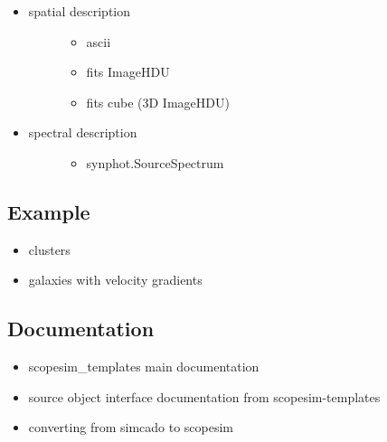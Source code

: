 \begin{itemize}
\item 
\begin{description}
\item[{spatial description}] \leavevmode 
\begin{itemize}
\item ascii

\item fits ImageHDU

\item fits cube (3D ImageHDU)
\end{itemize}

\end{description}

\item 
\begin{description}
\item[{spectral description}] \leavevmode 
\begin{itemize}
\item synphot.SourceSpectrum
\end{itemize}

\end{description}
\end{itemize}


\subsection{Example%
  \label{example}%
}


\begin{itemize}
\item clusters

\item galaxies with velocity gradients
\end{itemize}


\subsection{Documentation%
  \label{documentation}%
}

\begin{itemize}
\item scopesim\_templates main documentation

\item source object interface documentation from scopesim-templates

\item converting from simcado to scopesim
\end{itemize}
